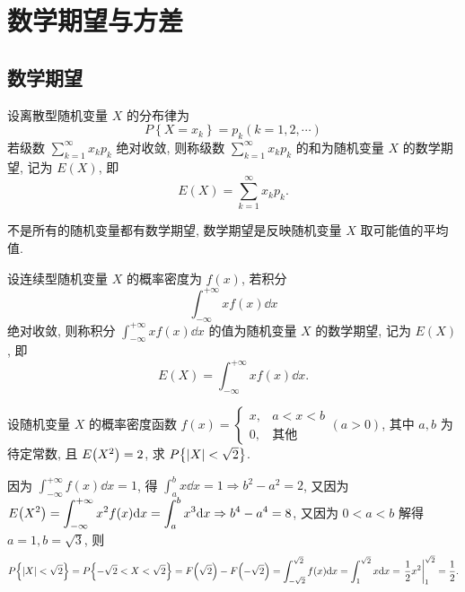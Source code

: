 \section{数学期望与方差}

\subsection{数学期望}

\begin{definition}[离散型随机变量的数学期望]
    设离散型随机变量 $ X $ 的分布律为 $$ P\left\{X=x_{k}\right\}=p_{k}(k=1,2, \cdots) $$
    若级数 $ \displaystyle\sum_{k=1}^{\infty} x_{k} p_{k} $ 绝对收敛, 则称级数 $ \displaystyle\sum_{k=1}^{\infty} x_{k} p_{k} $
    的和为随机变量 $ X $ 的数学期望, 记为 $ E(X) $, 即 $$ \displaystyle E(X)=\sum_{k=1}^{\infty} x_{k} p_{k}.$$
\end{definition}

不是所有的随机变量都有数学期望, 数学期望是反映随机变量 $X$ 取可能值的平均值.

\begin{definition}[连续型随机变量的数学期望]
    设连续型随机变量 $ X $ 的概率密度为 $ f(x) $, 若积分 $$ \displaystyle\int_{-\infty}^{+\infty} x f(x) \dd x $$ 绝对收敛, 
    则称积分 $\displaystyle \int_{-\infty}^{+\infty} x f(x) \dd x $ 的值为随机变量 $ X $ 的数学期望, 记为 $ E(X) $, 即 $$ E(X)=\int_{-\infty}^{+\infty} x f(x) \dd x .$$
\end{definition}

\begin{example}
    设随机变量 $X$ 的概率密度函数 $f(x)=\begin{cases}
            x, & a<x<b       \\
            0, & \text{其他}
        \end{cases} (a>0)$, 其中 $a,b$ 为待定常数, 且 $E\qty(X^2)=2$, 求 $P\qty{|X|<\sqrt{2}}$.
\end{example}
\begin{solution}
    因为 $\displaystyle\int_{-\infty}^{+\infty}f(x)\dd x=1$, 得 $\displaystyle \int_{a}^{b}x\dd x=1\Rightarrow b^2-a^2=2$, 又因为 $\displaystyle E\qty(X^2)=\int_{-\infty}^{+\infty}x^2f(x)\dd x=\int_{a}^{b}x^3\dd x\Rightarrow b^4-a^4=8$, 又因为 $0<a<b$ 解得 $a=1,b=\sqrt{3}$, 
    则 $$P\qty{|X|<\sqrt{2}}=P\qty{-\sqrt{2}<X<\sqrt{2}}=F\qty(\sqrt{2})-F\qty(-\sqrt{2})=\displaystyle\int_{-\sqrt{2}}^{\sqrt{2}}f(x)\dd x=\int_{1}^{\sqrt{2}}x\dd x=\eval{\dfrac{1}{2}x^2}_{1}^{\sqrt{2}}=\dfrac{1}{2}.$$
\end{solution}

